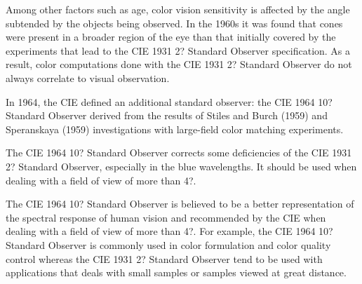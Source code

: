 


Among other factors such as age, color vision sensitivity is affected by the angle subtended by the objects being observed. In the 1960s it was found that cones were present in a broader region of the eye than that initially covered by the experiments that lead to the CIE 1931 2? Standard Observer specification. As a result, color computations done with the CIE 1931 2? Standard Observer do not always correlate to visual observation.

In 1964, the CIE defined an additional standard observer: the CIE 1964 10? Standard Observer derived from the results of Stiles and Burch (1959) and Speranskaya (1959) investigations with large-field color matching experiments.


The CIE 1964 10? Standard Observer corrects some deficiencies of the CIE 1931 2? Standard Observer, especially in the blue wavelengths. It should be used when dealing with a field of view of more than 4?.

The CIE 1964 10? Standard Observer is believed to be a better representation of the spectral response of human vision and recommended by the CIE when dealing with a field of view of more than 4?. For example, the CIE 1964 10? Standard Observer is commonly used in color formulation and color quality control whereas the CIE 1931 2? Standard Observer tend to be used with applications that deals with small samples or samples viewed at great distance.

